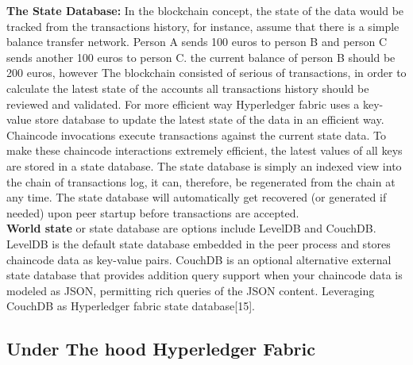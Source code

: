 \textbf{The State Database:} In the blockchain concept, the state of the data would be tracked from the transactions history, for instance, assume that there is a simple balance transfer network. Person A sends 100 euros to person B and person C sends another 100 euros to person C. the current balance of person B should be 200 euros, however The blockchain consisted of serious of transactions, in order to calculate the latest state of the accounts all transactions history should be reviewed and validated. For more efficient way Hyperledger fabric uses a key-value store database to update the latest state of the data in an efficient way.
Chaincode invocations execute transactions against the current state data. To make these chaincode interactions extremely efficient, the latest values of all keys are stored in a state database. The state database is simply an indexed view into the chain of transactions log, it can, therefore, be regenerated from the chain at any time. The state database will automatically get recovered (or generated if needed) upon peer startup before transactions are accepted.\\

\textbf{World state} or state database are options include LevelDB and CouchDB. LevelDB is the default state database embedded in the peer process and stores chaincode data as key-value pairs. CouchDB is an optional alternative external state database that provides addition query support when your chaincode data is modeled as JSON, permitting rich queries of the JSON content. Leveraging CouchDB as Hyperledger fabric state database[15].


\cleardoublepage

\subsection{Under The hood Hyperledger Fabric }

